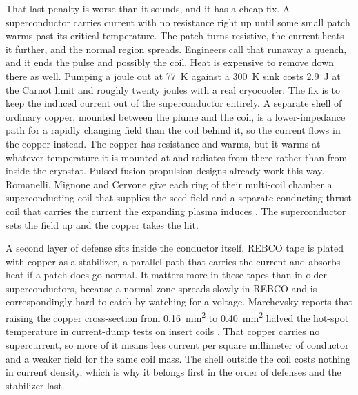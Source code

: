 \documentclass{article}
\begin{document}
That last penalty is worse than it sounds, and it has a cheap fix. A superconductor carries current with no resistance right up until some small patch warms past its critical temperature. The patch turns resistive, the current heats it further, and the normal region spreads. Engineers call that runaway a quench, and it ends the pulse and possibly the coil. Heat is expensive to remove down there as well. Pumping a joule out at \SI{77}{\kelvin} against a \SI{300}{\kelvin} sink costs \SI{2.9}{\joule} at the Carnot limit and roughly twenty joules with a real cryocooler. The fix is to keep the induced current out of the superconductor entirely. A separate shell of ordinary copper, mounted between the plume and the coil, is a lower-impedance path for a rapidly changing field than the coil behind it, so the current flows in the copper instead. The copper has resistance and warms, but it warms at whatever temperature it is mounted at and radiates from there rather than from inside the cryostat. Pulsed fusion propulsion designs already work this way. Romanelli, Mignone and Cervone give each ring of their multi-coil chamber a superconducting coil that supplies the seed field and a separate conducting thrust coil that carries the current the expanding plasma induces \cite{romanelli2017pulsed_fusion_nozzle}. The superconductor sets the field up and the copper takes the hit.

A second layer of defense sits inside the conductor itself. REBCO tape is plated with copper as a stabilizer, a parallel path that carries the current and absorbs heat if a patch does go normal. It matters more in these tapes than in older superconductors, because a normal zone spreads slowly in REBCO and is correspondingly hard to catch by watching for a voltage. Marchevsky reports that raising the copper cross-section from \SI{0.16}{\square\milli\meter} to \SI{0.40}{\square\milli\meter} halved the hot-spot temperature in current-dump tests on insert coils \cite{marchevsky2021quench}. That copper carries no supercurrent, so more of it means less current per square millimeter of conductor and a weaker field for the same coil mass. The shell outside the coil costs nothing in current density, which is why it belongs first in the order of defenses and the stabilizer last.
\end{document}
